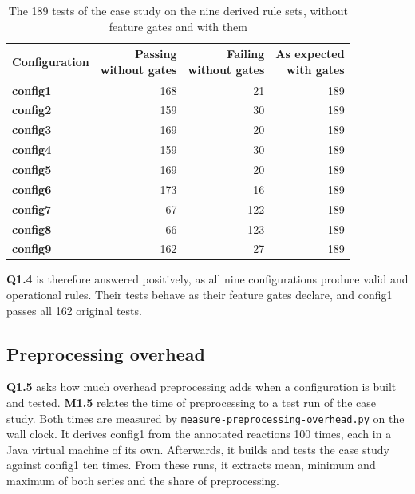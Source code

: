 \begin{table}[htbp]
    \centering
    \begin{tabular}{|l|r|r|r|}
        \hline
        \textbf{Configuration} & \makecell{\textbf{Passing}             \\ \textbf{without gates}} & \makecell{\textbf{Failing} \\ \textbf{without gates}} & \makecell{\textbf{As expected} \\ \textbf{with gates}} \\
        \hline
        \textbf{config1}       & 168                        & 21  & 189 \\
        \hline
        \textbf{config2}       & 159                        & 30  & 189 \\
        \hline
        \textbf{config3}       & 169                        & 20  & 189 \\
        \hline
        \textbf{config4}       & 159                        & 30  & 189 \\
        \hline
        \textbf{config5}       & 169                        & 20  & 189 \\
        \hline
        \textbf{config6}       & 173                        & 16  & 189 \\
        \hline
        \textbf{config7}       & 67                         & 122 & 189 \\
        \hline
        \textbf{config8}       & 66                         & 123 & 189 \\
        \hline
        \textbf{config9}       & 162                        & 27  & 189 \\
        \hline
    \end{tabular}
    \caption{The 189 tests of the case study on the nine derived rule sets, without feature gates and with them}
    \label{table:case-study-tests}
\end{table}

\textbf{Q1.4} is therefore answered positively, as all nine configurations produce valid and operational rules.
Their tests behave as their feature gates declare, and config1 passes all 162 original tests.

\subsection{Preprocessing overhead}
\label{sec:Evaluation:AnnotationMechanism:PreprocessingOverhead}

\textbf{Q1.5} asks how much overhead preprocessing adds when a configuration is built and tested.
\textbf{M1.5} relates the time of preprocessing to a test run of the case study.
Both times are measured by \texttt{measure-preprocessing-overhead.py} on the wall clock.
It derives config1 from the annotated reactions 100 times, each in a Java virtual machine of its own.
Afterwards, it builds and tests the case study against config1 ten times.
From these runs, it extracts mean, minimum and maximum of both series and the share of preprocessing.

